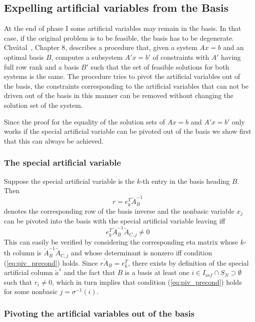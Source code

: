 \documentclass[a4paper]{article}
\begin{document}
\subsection{Expelling artificial variables from the Basis}
At the end of phase I some artificial variables may remain in the basis.
In that case, if the original problem is to be feasible, the basis has to be
degenerate.
Chv\'{a}tal~\cite{Chvatal}, Chapter 8, describes a procedure that,
given a system $Ax = b$ and an optimal
basis $B$, computes a subsystem $A'x = b'$ of constraints with $A'$ having full
row rank and a basis $B'$ such that the set of feasible solutions for both
systems is the same. The procedure tries to pivot the artificial variables out of
the basis, the constraints corresponding to the artificial variables that can
not be driven out of the basis in this manner can be removed without changing
the solution set of the system.

Since the proof for the equality of the solution sets of $Ax = b$ and
$A'x = b'$ only works if the special artificial variable can be pivoted out of
the basis we show first that this can always be achieved.
\subsubsection{The special artificial variable}
Suppose the special artificial variable is the $k$-th entry in the basis
heading $B$. Then 
\[ 
  r = e_{k}^{T} \check{A}_{B}^{-1}
\]
denotes the corresponding row of the basis inverse and
the nonbasic variable $x_{j}$ can be pivoted into the basis
with the special artificial variable leaving iff 
\begin{equation} \label{eq:piv_precond}
e_{k}^{T}\check{A}_{B}^{-1}\tilde{A}_{C,j} \neq 0
\end{equation}
This can easily be verified by considering the corresponding eta matrix
whose $k$-th column is $\check{A}_{B}^{-1}\tilde{A}_{C,j}$ and whose determinant
is nonzero iff condition (\ref{eq:piv_precond}) holds.
Since $r \check{A}_{B} = e_{k}^{T}$, there exists by definition of 
the special artificial column $\tilde{a}^{s}$ and the fact that $B$ is a basis
at least one
$i \in I_{inf} \cap S_{N} \supset \emptyset$ such that
$r_{i} \neq 0$, which in turn implies that condition
(\ref{eq:piv_precond}) holds for some nonbasic
$j = \sigma^{-1} \left( i \right)$.

\subsubsection{Pivoting the artificial variables out of the basis}
\end{document}
